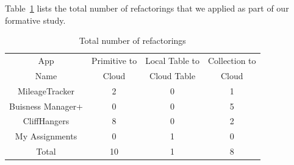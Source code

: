 \documentclass{sigplanconf}
\begin{document}
Table~\ref{tab:refactoringsFormative} lists the total number of refactorings that we applied as part of our formative study.

\begin{table}[htdp]

\begin{center}
\begin{tabular}{|c|c|c|c|}
\hline
App  & Primitive to  & Local Table to   & Collection to  \\
 Name &  Cloud  &  Cloud Table  & Cloud \\
\hline
MileageTracker & 2 & 0 & 1\\
\hline
Buisness Manager+ & 0 & 0 & 5\\
\hline
CliffHangers & 8 & 0 & 2\\
\hline
My Assignments & 0 & 1 & 0\\
\hline
\hline
Total & 10 & 1  & 8 \\
\hline
\end{tabular}
\end{center}
\nocaptionrule
\caption{Total number of refactorings}
\label{tab:refactoringsFormative}
\end{table}%



\end{document}

